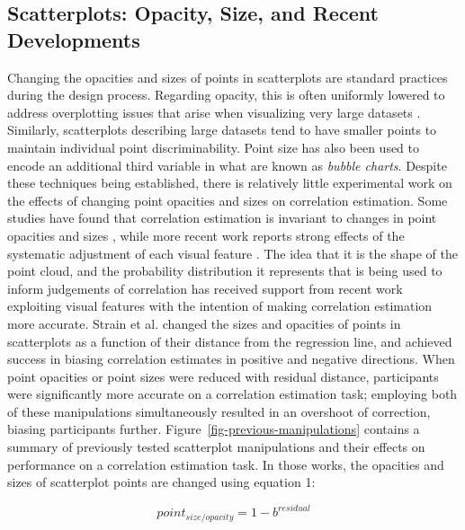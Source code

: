 \documentclass[manuscript,screen,review,anonymous]{acmart}
\begin{document}
\subsection{Scatterplots: Opacity, Size, and Recent
Developments}\label{sec-scatterplots}

Changing the opacities and sizes of points in scatterplots are standard
practices during the design process. Regarding opacity, this is often
uniformly lowered to address overplotting issues that arise when
visualizing very large datasets \citep{matejka_2015}. Similarly,
scatterplots describing large datasets tend to have smaller points to
maintain individual point discriminability. Point size has also been
used to encode an additional third variable in what are known as
\emph{bubble charts}. Despite these techniques being established, there
is relatively little experimental work on the effects of changing point
opacities and sizes on correlation estimation. Some studies have found
that correlation estimation is invariant to changes in point opacities
and sizes \citep{rensink_2014, rensink_2017}, while more recent work
reports strong effects of the systematic adjustment of each visual
feature \citep{strain_2023, strain_2023b, strain_2024}. The idea that it
is the shape of the point cloud, and the probability distribution it
represents that is being used to inform judgements of correlation has
received support from recent work exploiting visual features with the
intention of making correlation estimation more accurate. Strain et al.
\citep{strain_2023, strain_2023b, strain_2024} changed the sizes and
opacities of points in scatterplots as a function of their distance from
the regression line, and achieved success in biasing correlation
estimates in positive and negative directions. When point opacities
\citep{strain_2023} or point sizes \citep{strain_2023b} were reduced
with residual distance, participants were significantly more accurate on
a correlation estimation task; employing both of these manipulations
simultaneously \citep{strain_2024} resulted in an overshoot of
correction, biasing participants further.
Figure~\ref{fig-previous-manipulations} contains a summary of previously
tested scatterplot manipulations and their effects on performance on a
correlation estimation task. In those works, the opacities and sizes of
scatterplot points are changed using equation 1:

\begin{equation}
  point_{size/opacity} = 1 - b^{residual}
\end{equation}
\end{document}
